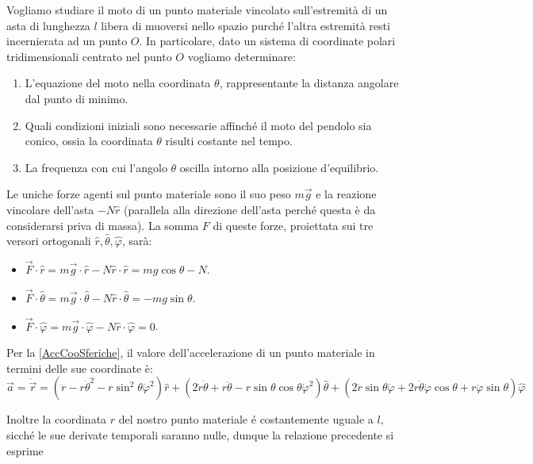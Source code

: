 \documentclass[../main.tex]{subfiles}
\begin{document}

\textex

Vogliamo studiare il moto di un punto materiale vincolato sull'estremità di un asta di lunghezza $l$ libera di muoversi nello spazio purché l'altra estremità resti incernierata ad un punto $O$.
In particolare, dato un sistema di coordinate polari tridimensionali centrato nel punto $O$ vogliamo determinare:
\begin{enumerate}
\item L'equazione del moto nella coordinata $\theta$, rappresentante la distanza angolare dal punto di minimo.
\item Quali condizioni iniziali sono necessarie affinché il moto del pendolo sia conico, ossia la coordinata $\theta$ risulti costante nel tempo.
\item La frequenza con cui l'angolo $\theta$ oscilla intorno alla posizione d'equilibrio.
\end{enumerate}

\solution
Le uniche forze agenti sul punto materiale sono il suo peso $m\vec{g}$ e la reazione vincolare dell'asta $-N\hat{r}$ (parallela alla direzione dell'asta perch\'e questa \`e da considerarsi priva di massa).
La somma $F$ di queste forze, proiettata sui tre versori ortogonali $\hat{r}, \hat{\theta}, \hat{\varphi}$, sar\`a:
\begin{itemize}
 \item $\vec{F}\cdot\hat{r}=m\vec{g}\cdot\hat{r}-N\hat{r}\cdot\hat{r}=mg\cos\theta -N$.
 \item $\vec{F}\cdot\hat{\theta}=m\vec{g}\cdot\hat{\theta}-N\hat{r}\cdot\hat{\theta}=-mg\sin\theta$.
 \item $\vec{F}\cdot\hat{\varphi}=m\vec{g}\cdot\hat{\varphi}-N\hat{r}\cdot\hat{\varphi}=0$.
\end{itemize}

Per la \cref{AccCooSferiche}, il valore dell'accelerazione di un punto materiale in termini delle sue coordinate è:
$$ \vec{a}=\ddot{\vec{r}}=(\ddot{r}-r\dot{\theta}^2-r\sin^2{\theta}\dot{\varphi}^2)\hat{r}+(2\dot{r}\dot{\theta}+r\ddot{\theta}-r\sin\theta\cos\theta\dot{\varphi}^2)\hat{\theta}+(2\dot{r}\sin\theta\dot{\varphi}+2r\dot{\theta}\dot{\varphi}\cos\theta+r\ddot{\varphi}\sin\theta)\hat{\varphi} $$

Inoltre la coordinata $r$ del nostro punto materiale \'e costantemente uguale a $l$, sicch\'e le sue derivate temporali saranno nulle, dunque la relazione precedente si esprime
\end{document}
